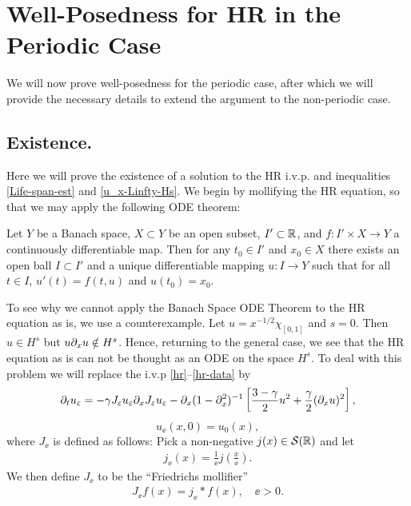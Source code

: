 \section{Well-Posedness for HR in the Periodic Case}
%
%
%
%
We will now prove well-posedness for the periodic case, after which we will
provide the necessary details to extend the argument to the non-periodic case.
\subsection{Existence.}
\label{existence}
Here we will prove the existence of a solution to the HR i.v.p. and inequalities
\eqref{Life-span-est} and \eqref{u_x-Linfty-Hs}.  We begin by mollifying the HR equation, so that we may apply the following ODE
theorem: 
%
\begin{theorem}
	\label{ode_theorem}
	Let  $Y$  be a Banach space, $X\subset Y$ be an open subset,
	$I' \subset \mathbb{R}$, and $f: I' \times X\to Y$ a continuously differentiable
	map.  Then for any $t_{0} \in I'$ and $x_{0} \in X$ there exists an
	open ball $I \subset I'$ and a unique differentiable mapping $u:I
	\to Y$ such that for all $t \in I$,  $u'(t) = f(t, u)$
	and $u(t_{0}) = x_{0}.$
\end{theorem}
%
To see why we cannot apply the Banach Space ODE Theorem to the HR equation as is,
we use a counterexample. Let $u=x^{-1/2} \chi_{[0,1]}$ and $s=0$. Then $u \in H^s$ but
$u\partial_x u \notin H^s$. Hence, returning to the general case, we see that the
HR equation as is can not be thought as an ODE on the space $H^s$.  To
deal with this problem we will replace the i.v.p \eqref{hr}--\eqref{hr-data} by  
\begin{equation}
	\label{hr-moli}
	\partial_t  u_\varepsilon =
	-\gamma J_\varepsilon u_\varepsilon \partial_x  J_\varepsilon  u_\varepsilon - \partial_x (1-\partial_x^2)^{-1} 
	\left [\frac{3-\gamma}{2}u^2 + \frac{\gamma}{2}(\partial_x u)^2 \right ],
\end{equation} 
%
\begin{equation} 
	\label{hr-moli-data} 
	u_\ee(x, 0) = u_0 (x),
\end{equation}
%
where $J_\ee$ is defined as follows: Pick a non-negative $j(x) \in
\mathcal{S}(\mathbb{R})$ and let
\begin{equation*}
	\begin{split}
		j_\ee(x) = \frac{1}{\ee}j\left( \frac{x}{\ee} \right).
	\end{split}
\end{equation*}
	We then define $J_\ee$ to be the ``Friedrichs mollifier''
	\begin{equation}
		\begin{split}
			J_\ee f(x) = j_\ee * f(x), \quad \ee>0.
		\end{split}
	\end{equation}
